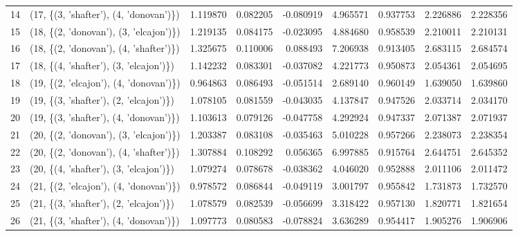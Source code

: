 \begin{tabular}{llrrrrrrr}
14 &  (17, \{(3, 'shafter'), (4, 'donovan')\}) &  1.119870 &   0.082205 & -0.080919 &   4.965571 &  0.937753 &   2.226886 &  2.228356 \\
15 &  (18, \{(2, 'donovan'), (3, 'elcajon')\}) &  1.219135 &   0.084175 & -0.023095 &   4.884680 &  0.958539 &   2.210011 &  2.210131 \\
16 &  (18, \{(2, 'donovan'), (4, 'shafter')\}) &  1.325675 &   0.110006 &  0.088493 &   7.206938 &  0.913405 &   2.683115 &  2.684574 \\
17 &  (18, \{(4, 'shafter'), (3, 'elcajon')\}) &  1.142232 &   0.083301 & -0.037082 &   4.221773 &  0.950873 &   2.054361 &  2.054695 \\
18 &  (19, \{(2, 'elcajon'), (4, 'donovan')\}) &  0.964863 &   0.086493 & -0.051514 &   2.689140 &  0.960149 &   1.639050 &  1.639860 \\
19 &  (19, \{(3, 'shafter'), (2, 'elcajon')\}) &  1.078105 &   0.081559 & -0.043035 &   4.137847 &  0.947526 &   2.033714 &  2.034170 \\
20 &  (19, \{(3, 'shafter'), (4, 'donovan')\}) &  1.103613 &   0.079126 & -0.047758 &   4.292924 &  0.947337 &   2.071387 &  2.071937 \\
21 &  (20, \{(2, 'donovan'), (3, 'elcajon')\}) &  1.203387 &   0.083108 & -0.035463 &   5.010228 &  0.957266 &   2.238073 &  2.238354 \\
22 &  (20, \{(2, 'donovan'), (4, 'shafter')\}) &  1.307884 &   0.108292 &  0.056365 &   6.997885 &  0.915764 &   2.644751 &  2.645352 \\
23 &  (20, \{(4, 'shafter'), (3, 'elcajon')\}) &  1.079274 &   0.078678 & -0.038362 &   4.046020 &  0.952888 &   2.011106 &  2.011472 \\
24 &  (21, \{(2, 'elcajon'), (4, 'donovan')\}) &  0.978572 &   0.086844 & -0.049119 &   3.001797 &  0.955842 &   1.731873 &  1.732570 \\
25 &  (21, \{(3, 'shafter'), (2, 'elcajon')\}) &  1.078579 &   0.082539 & -0.056699 &   3.318422 &  0.957130 &   1.820771 &  1.821654 \\
26 &  (21, \{(3, 'shafter'), (4, 'donovan')\}) &  1.097773 &   0.080583 & -0.078824 &   3.636289 &  0.954417 &   1.905276 &  1.906906 \\
\bottomrule
\end{tabular}
